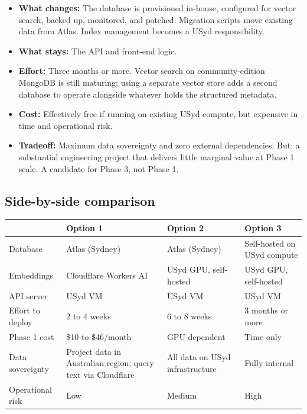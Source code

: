 \documentclass[11pt,a4paper]{article}
\begin{document}
\begin{itemize}[leftmargin=1.5em,itemsep=2pt]
  \item \textbf{What changes:} The database is provisioned in-house, configured for vector search, backed up, monitored, and patched. Migration scripts move existing data from Atlas. Index management becomes a USyd responsibility.
  \item \textbf{What stays:} The API and front-end logic.
  \item \textbf{Effort:} Three months or more. Vector search on community-edition MongoDB is still maturing; using a separate vector store adds a second database to operate alongside whatever holds the structured metadata.
  \item \textbf{Cost:} Effectively free if running on existing USyd compute, but expensive in time and operational risk.
  \item \textbf{Tradeoff:} Maximum data sovereignty and zero external dependencies. But: a substantial engineering project that delivers little marginal value at Phase 1 scale. A candidate for Phase 3, not Phase 1.
\end{itemize}

\subsection{Side-by-side comparison}

\medskip

\noindent\begin{tabularx}{\textwidth}{l X X X}
\toprule
& \textbf{Option 1} & \textbf{Option 2} & \textbf{Option 3} \\
\midrule
Database & Atlas (Sydney) & Atlas (Sydney) & Self-hosted on USyd compute \\
Embeddings & Cloudflare Workers AI & USyd GPU, self-hosted & USyd GPU, self-hosted \\
API server & USyd VM & USyd VM & USyd VM \\
Effort to deploy & 2 to 4 weeks & 6 to 8 weeks & 3 months or more \\
Phase 1 cost & \$10 to \$46/month & GPU-dependent & Time only \\
Data sovereignty & Project data in Australian region; query text via Cloudflare & All data on USyd infrastructure & Fully internal \\
Operational risk & Low & Medium & High \\
\bottomrule
\end{tabularx}
\end{document}
